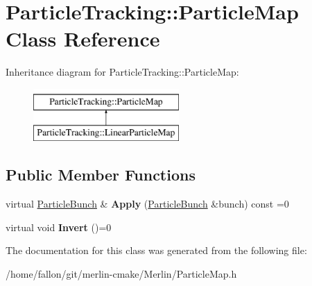 \hypertarget{classParticleTracking_1_1ParticleMap}{}\section{Particle\+Tracking\+:\+:Particle\+Map Class Reference}
\label{classParticleTracking_1_1ParticleMap}
Inheritance diagram for Particle\+Tracking\+:\+:Particle\+Map\+:\begin{figure}[H]
\begin{center}
\leavevmode
\includegraphics[height=2.000000cm]{classParticleTracking_1_1ParticleMap}
\end{center}
\end{figure}
\subsection*{Public Member Functions}
\begin{DoxyCompactItemize}
\item 
\mbox{\label{classParticleTracking_1_1ParticleMap_a47541e2dd0493a13a2c7216df08f150b}} 
virtual \hyperlink{classParticleTracking_1_1ParticleBunch}{Particle\+Bunch} \& {\bfseries Apply} (\hyperlink{classParticleTracking_1_1ParticleBunch}{Particle\+Bunch} \&bunch) const =0
\item 
\mbox{\label{classParticleTracking_1_1ParticleMap_a9b2cb76aa2e954bb600c24436a8f21ec}} 
virtual void {\bfseries Invert} ()=0
\end{DoxyCompactItemize}


The documentation for this class was generated from the following file\+:\begin{DoxyCompactItemize}
\item 
/home/fallon/git/merlin-\/cmake/\+Merlin/Particle\+Map.\+h\end{DoxyCompactItemize}
